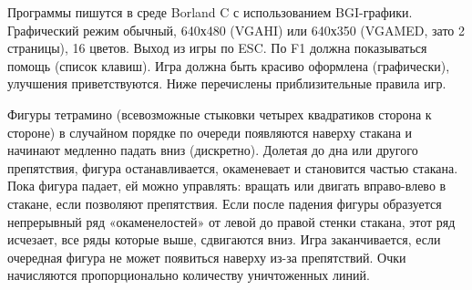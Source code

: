 
Программы пишутся в среде Borland C с использованием BGI-графики. Графический
режим обычный, 640х480 (VGAHI) или 640х350 (VGAMED, зато 2 страницы), 16
цветов. Выход из игры по ESC. По F1 должна показываться помощь (список
клавиш). Игра должна быть красиво оформлена (графически), улучшения
приветствуются. Ниже перечислены приблизительные правила игр.

\zzsectionCOMMENTS

\zzsectionPLAN

\zzsectionVARIATIONS

\begin{zztask}[Tetris]
Фигуры тетрамино (всевозможные стыковки четырех квадратиков сторона к стороне)
в случайном порядке по очереди появляются наверху стакана и начинают медленно
падать вниз (дискретно). Долетая до дна или другого препятствия, фигура
останавливается, окаменевает и становится частью стакана. Пока фигура падает,
ей можно управлять: вращать или двигать вправо-влево в стакане, если позволяют
препятствия. Если после падения фигуры образуется непрерывный ряд
«окаменелостей» от левой до правой стенки стакана, этот ряд исчезает, все ряды
которые выше, сдвигаются вниз. Игра заканчивается, если очередная фигура не
может появиться наверху из-за препятствий. Очки начисляются пропорционально
количеству уничтоженных линий.
\end{zztask}


